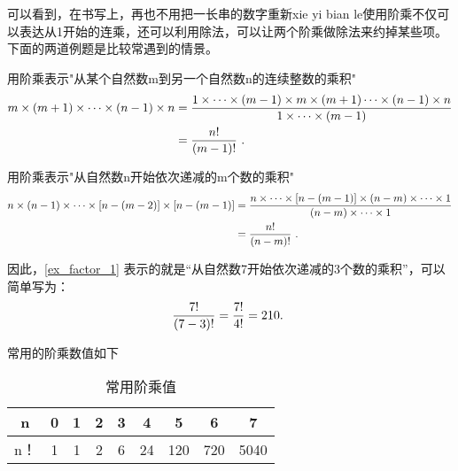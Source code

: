可以看到，在书写上，再也不用把一长串的数字重新xie yi bian le使用阶乘不仅可以表达从1开始的连乘，还可以利用除法，可以让两个阶乘做除法来约掉某些项。下面的两道例题是比较常遇到的情景。

\begin{example}{用阶乘表示"从某个自然数m到另一个自然数n的连续整数的乘积"}
\begin{align*}
m\times(m+1)\times\cdots \times(n-1)\times n&={1\times\cdots \times(m-1)\times m\times(m+1)\cdots \times(n-1)\times n\over 1\times\cdots \times(m-1)}\\
&={n!\over (m-1)!}~.
\end{align*}
\end{example}

\begin{example}{用阶乘表示"从自然数n开始依次递减的m个数的乘积"}
\begin{align*}
n\times(n-1)\times\cdots \times[n-(m-2)]\times [n-(m-1)]&={n\times\cdots \times [n-(m-1)]\times(n-m)\times\cdots\times1\over (n-m)\times\cdots \times1}\\
&={n!\over (n-m)!}~.
\end{align*}
\end{example}

因此，\autoref{ex_factor_1} 表示的就是“从自然数7开始依次递减的3个数的乘积”，可以简单写为：
$${7!\over (7-3)!}={7!\over 4!}=210.~$$

常用的阶乘数值如下\begin{table}[ht]
\centering
\caption{常用阶乘值}\label{tab_factor1}
\begin{tabular}{|c|c|c|c|c|c|c|c|c|}
\hline
n & 0 & 1 & 2 & 3 & 4 & 5 & 6 & 7\\
\hline
n！ & 1 & 1 & 2 & 6 & 24 & 120 & 720 & 5040\\
\hline
\end{tabular}
\end{table}